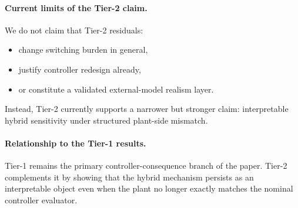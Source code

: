 \paragraph{Current limits of the Tier-2 claim.}
We do not claim that Tier-2 residuals:
\begin{itemize}
    \item change switching burden in general,
    \item justify controller redesign already,
    \item or constitute a validated external-model realism layer.
\end{itemize}
Instead, Tier-2 currently supports a narrower but stronger claim: interpretable hybrid sensitivity under structured plant-side mismatch.

\paragraph{Relationship to the Tier-1 results.}
Tier-1 remains the primary controller-consequence branch of the paper. Tier-2 complements it by showing that the hybrid mechanism persists as an interpretable object even when the plant no longer exactly matches the nominal controller evaluator.
